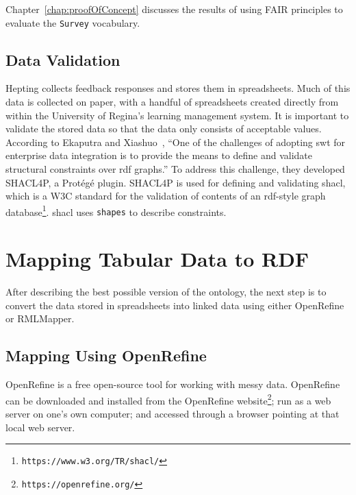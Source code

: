 \begin{doublespace}
\begin{itemize}
\end{itemize}

Chapter~\ref{chap:proofOfConcept} discusses the results of using 
FAIR principles to evaluate the {\tt Survey} vocabulary.

\subsection{Data Validation}
\label{subsec:datavalidation}

Hepting collects feedback responses and 
stores them in spreadsheets. 
Much of this data is collected on paper,
with a handful of spreadsheets created directly
from within the University of Regina's learning management system.
It is important to validate the stored data 
so that the data only consists of acceptable values. 
According to Ekaputra and Xiashuo~\cite{shacl4protege}, 
``One of the challenges of adopting \ac{swt} 
for enterprise data integration is to provide the means 
to define and validate structural constraints over \ac{rdf} graphs.'' 
To address this challenge, 
they developed SHACL4P, 
a Protégé plugin. 
SHACL4P is used for defining and validating \ac{shacl}, 
which is a W3C standard 
for the validation of contents of 
an \ac{rdf}-style graph database\footnote{\tt https://www.w3.org/TR/shacl/}. 
\ac{shacl} uses {\tt shapes} to describe constraints.

\section{Mapping Tabular Data to RDF}
\label{sec:csvtolodconversion}

After describing the best possible version of the ontology, 
the next step is to convert the data stored in spreadsheets into linked data 
using either OpenRefine or RMLMapper. 

\subsection{Mapping Using OpenRefine}
\label{subsec:openrefinemapping}

OpenRefine is a free 
open-source tool for working with messy data. 
OpenRefine can be downloaded and installed 
from the OpenRefine website\footnote{\tt https://openrefine.org/}; 
run as a web server on one's own computer;  
and accessed through a browser pointing at that local web server. 


\end{doublespace}
